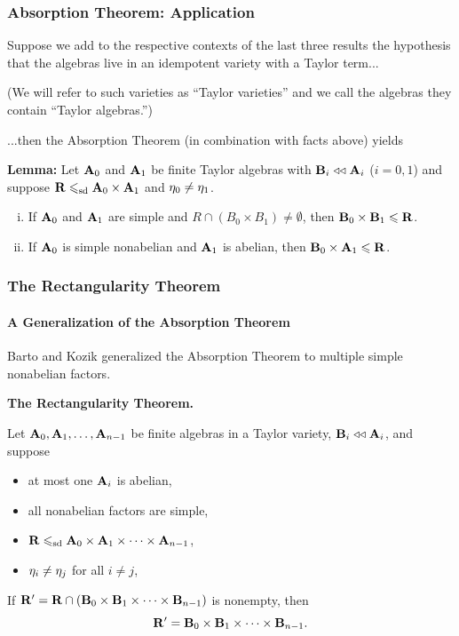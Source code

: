 \documentclass[xcolor=dvipsnames,9pt,hide notes,mathserif]{beamer}
\begin{document}
\begin{frame} \frametitle{Absorption Theorem: Application}
  Suppose we add to the respective contexts of the last three results the hypothesis
  that the algebras live in an idempotent variety with a Taylor term...

  \bigskip  
  (We will refer to such varieties as ``Taylor varieties'' and we call the
  algebras they contain ``Taylor algebras.'')

  \bigskip  
  ...then the Absorption Theorem (in combination with facts above) yields

  \bigskip  
  {\bf Lemma:}
  Let $\mathbf{A}_0$ and $\mathbf{A}_1$ be finite Taylor algebras
  with $\mathbf{B}_i\mathrel{\triangleleft\triangleleft} \mathbf{A}_i$ ($i =0,1$)
  and suppose $\mathbf{R} \leqslant_{\mathrm{sd}} \mathbf{A}_0 \times \mathbf{A}_1$ and $\eta_0 \neq \eta_1$.
    \begin{enumerate}[(i)]
    \item If $\mathbf{A}_0$ and $\mathbf{A}_1$ are simple and $R\cap (B_0 \times B_1) \neq \emptyset$, then
      $\mathbf{B}_0 \times \mathbf{B}_1\leqslant \mathbf{R}$. 
    \item  If $\mathbf{A}_0$ is simple nonabelian and $\mathbf{A}_1$ is abelian,
      then $\mathbf{B}_0 \times \mathbf{A}_1 \leqslant \mathbf{R}$.
    \end{enumerate}

    \bigskip

    \bigskip

    \bigskip
    
\end{frame}


\begin{frame} \frametitle{The Rectangularity Theorem}
  \framesubtitle{A Generalization of the Absorption Theorem}

  Barto and Kozik generalized the Absorption Theorem
  to multiple simple nonabelian factors.
  \bigskip
  
  {\bf The Rectangularity Theorem.}

  \medskip
  Let $\mathbf{A}_0, \mathbf{A}_1, \dots, \mathbf{A}_{n-1}$ be finite algebras in a 
  Taylor variety, $\mathbf{B}_i \mathrel{\triangleleft\triangleleft} \mathbf{A}_i$, and suppose
  \begin{itemize}
  \item at most one $\mathbf{A}_i$ is abelian,
  \item all nonabelian factors are simple, 
  \item $\mathbf{R} \leqslant_{\mathrm{sd}} \mathbf{A}_0 \times \mathbf{A}_1 \times \cdots \times \mathbf{A}_{n-1}$,
  \item $\eta_i \neq \eta_j$ for all $i\neq j$, %
  \end{itemize}
  If $\mathbf{R}'= \mathbf{R} \cap (\mathbf{B}_0 \times \mathbf{B}_1 \times \cdots \times \mathbf{B}_{n-1})$ is
  nonempty, then \[\mathbf{R}' = \mathbf{B}_0 \times \mathbf{B}_1 \times \cdots \times \mathbf{B}_{n-1}.\] %
\end{frame}
\end{document}
